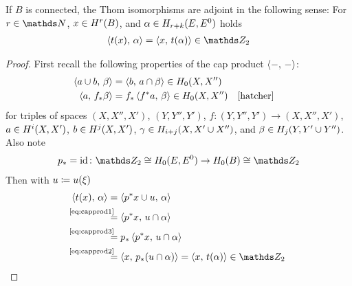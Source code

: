 \begin{Lem}\label{lem:thomisoself-adjoint}
  If $B$ is connected, the Thom isomorphisms are adjoint in the
  following sense:
  For $r\in\Nat$, $x\in H^r(B)$,
  and $\alpha\in H_{r+k}(E, {E}^0)$  holds 
  \begin{gather*}
    \capped{t(x)}{\alpha} = \capped{x}{t(\alpha)} \in\Zmod2
  \end{gather*}
  \begin{proof}
    First recall the following properties of the cap product
    $\left\langle -,\, - \right\rangle$:
    \begin{align}
      \label{eq:capprod1}
      \capped{a\cup b}{\beta} &= \capped{b}{a\cap\beta}
                                \in \H_0(X,X'')\\
      \label{eq:capprod2}
      \capped{a}{\pf f \beta} &= \pf f \capped{\pb f a}{\beta}
                                \in \H_0(X,X'')
                                &&\text{\cite[Chap.~3.3.2, p.\,241]{hatcher}}
    \end{align}
    for
    triples of spaces $(X, X'', X')$, $(Y, Y'', Y')$,
    $f\colon (Y,Y'',Y')\to (X,X'',X')$,
    $a\in H^i(X,X')$, $b\in H^j(X,X')$,
    $\gamma\in H_{i+j}(X, X'\cup X'')$,
    and
    $\beta\in H_j(Y, Y'\cup Y'')$.
    Also note
    \begin{gather}
      \label{eq:capprod3}
      \pf p = \Id \colon
      \Zmod2\cong \H_0(\thomspacepair{E})\to \H_0(B)\cong\Zmod2
    \end{gather}
    Then with $u\coloneqq{u}(\xi)$
    \begin{align*}
      \capped{t(x)}{\alpha}
      &= \capped{\pb p x \cup \U}{\alpha} \\
      &\equalsby{\eqref{eq:capprod1}}
        \capped{\pb p x}{\U\cap\alpha} \\
      &\equalsby{\eqref{eq:capprod3}}
        \pf p\capped{\pb p x}{\U\cap\alpha} \\
      &\equalsby{\eqref{eq:capprod2}}
        \capped{x}{\pf p(u\cap\alpha)}
        = \capped{x}{\thomiso (\alpha)} \in\Zmod2
    \end{align*}
  \end{proof}
\end{Lem}

